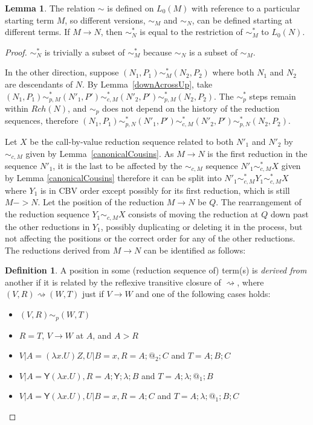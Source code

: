 \documentclass{article}
\newcommand{\tY}{\textsf{Y}}
\theoremstyle{definition}
\newtheorem{definition}{Definition}
\theoremstyle{lemma}
\newtheorem{lemma}{Lemma}
\theoremstyle{remark}
\begin{document}
\begin{lemma}
The relation $\sim$ is defined on $L_0(M)$ with reference to a particular starting term $M$, so different versions, $\sim_M$ and $\sim_N$, can be defined starting at different terms. If $M \to N$, then $\sim^*_N$ is equal to the restriction of $\sim^*_M$ to $L_0(N)$.
\end{lemma} 
\begin{proof}
$\sim_N^*$ is trivially a subset of $\sim_M^*$ because $\sim_N$ is a subset of $\sim_M$.

In the other direction, suppose $(N_1, P_1) \sim_M^* (N_2, P_2)$ where both $N_1$ and $N_2$ are descendants of $N$. By Lemma~\ref{downAcrossUp}, take $(N_1, P_1) \sim_{p,M}^* (N'_1, P') \sim_{c,M}^* (N'_2, P') \sim_{p,M}^* (N_2, P_2)$. 
The $\sim_p^*$ steps remain within $Rch(N)$, and $\sim_p$ does not depend on the history of the reduction sequences, therefore $(N_1, P_1) \sim_{p,N}^* (N'_1, P') \sim_{c,M}^* (N'_2, P') \sim_{p,N}^* (N_2, P_2)$.

Let $X$ be the call-by-value reduction sequence related to both $N'_1$ and $N'_2$ by $\sim_{c,M}$ given by Lemma~\ref{canonicalCousins}. 
As $M \to N$ is the first reduction in the sequence $N'_1$, it is the last to be affected by the $\sim_{c,M}$ sequence $N'_1 \sim_{c,M}^* X$ given by Lemma \ref{canonicalCousins} therefore it can be split into $N'_1 \sim_{c,M}^* Y_1 \sim_{c,M}^* X$ where $Y_1$ is in CBV order except possibly for its first reduction, which is still $M -> N$. Let the position of the reduction $M \to N$ be $Q$. 
The rearrangement of the reduction sequence $Y_1 \sim_{c,M} X$ consists of moving the reduction at $Q$ down past the other reductions in $Y_1$, possibly duplicating or deleting it in the process, but not affecting the positions or the correct order for any of the other reductions. 
The reductions derived from $M \to N$ can be identified as follows:

\begin{definition}
A position in some (reduction sequence of) term(s) is \emph{derived from} another if it is related by the reflexive transitive closure of $\rightsquigarrow$, where $(V,R) \rightsquigarrow (W,T)$ just if $V \to W$ and one of the following cases holds:
\begin{itemize}
    \item $(V,R) \sim_p (W,T)$
    \item $R = T$, $V \to W$ at $A$, and $A > R$
    \item $V | A = (\lambda x.U) Z, U | B = x, R = A;@_2;C$ and $T = A;B;C$
    \item $V | A = \tY (\lambda x.U), R = A;\tY;\lambda;B$ and $T = A;\lambda;@_1;B$
    \item $V | A = \tY (\lambda x.U), U | B = x, R = A;C$ and $T = A;\lambda;@_1;B;C$
\end{itemize}
\end{definition}


\end{proof}
\end{document}
